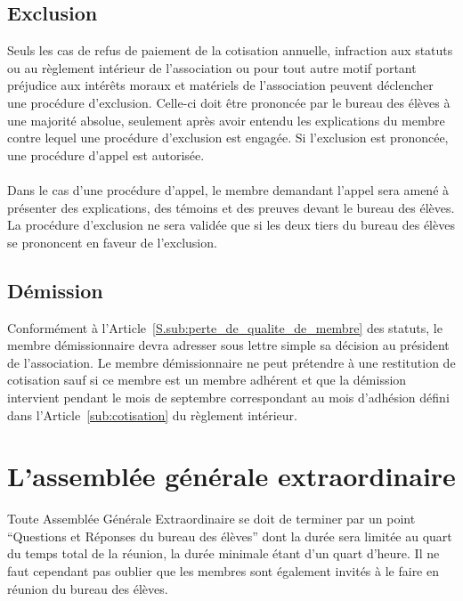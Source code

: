 \documentclass{article} %
\begin{document}
		\subsection{Exclusion}
\label{sub:exclusion}

			Seuls les cas de refus de paiement de la cotisation annuelle,
			infraction aux statuts ou au règlement intérieur de l'association ou
			pour tout autre motif portant préjudice aux intérêts moraux et
			matériels de l’association peuvent déclencher une procédure
			d’exclusion. Celle-ci doit être prononcée par le bureau des élèves à
			une majorité absolue, seulement après avoir entendu les explications
			du membre contre lequel une procédure d’exclusion est engagée. Si
			l’exclusion est prononcée, une procédure d’appel est autorisée.

            \paragraph{}
			Dans le cas d’une procédure d’appel, le membre demandant l’appel
			sera amené à présenter des explications, des témoins et des preuves
			devant le bureau des élèves. La procédure d’exclusion ne sera
			validée que si les deux tiers du bureau des élèves se prononcent en
			faveur de l’exclusion.

		\subsection{Démission}
\label{sub:demission}

			Conformément à l'Article~\ref{S.sub:perte_de_qualite_de_membre} des
			statuts, le membre démissionnaire devra adresser sous lettre simple
			sa décision au président de l’association. Le membre démissionnaire 
			ne peut prétendre à une restitution de cotisation sauf si ce membre 
			est un membre adhérent et que la démission intervient pendant le 
			mois de septembre correspondant au mois d'adhésion défini dans 
			l'Article~\ref{sub:cotisation} du règlement intérieur.

	\section{L'assemblée générale extraordinaire}
\label{sec:l_assemblee_generale_extraordinaire}

		Toute Assemblée Générale Extraordinaire se doit de terminer par un point
		“Questions et Réponses du bureau des élèves” dont la durée sera limitée
		au quart du temps total de la réunion, la durée minimale étant d’un
		quart d’heure. Il ne faut cependant pas oublier que les membres sont
		également invités à le faire en réunion du bureau des élèves.
\end{document}
